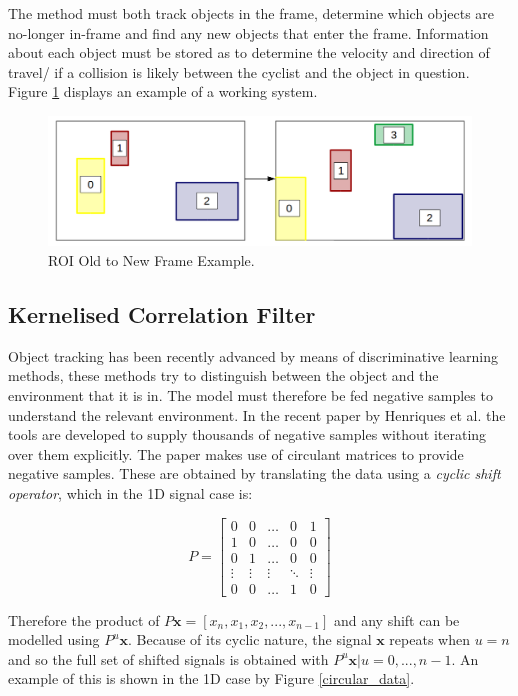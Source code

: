 \documentclass[a4paper,11pt,notitlepage]{article}
\begin{document}
The method must both track objects in the frame, determine which objects are no-longer in-frame and find any new objects that enter the frame. Information about each object must be stored as to determine the velocity and direction of travel/ if a collision is likely between the cyclist and the object in question. Figure \ref{roi_match} displays an example of a working system.

\noindent \begin{figure}[h!]
	\includegraphics[width = 1.0\hsize]{figures/roi_match.png}
	\caption{ROI Old to New Frame Example.}
	\label{roi_match}
\end{figure}


\subsection{Kernelised Correlation Filter}

Object tracking has been recently advanced by means of discriminative learning methods, these methods try to distinguish between the object and the environment that it is in. The model must therefore be fed negative samples to understand the relevant environment. In the recent paper by Henriques et al. \cite{kcf} the tools are developed to supply thousands of negative samples without iterating over them explicitly. The paper makes use of circulant matrices to provide negative samples. These are obtained by translating the data using a \textit{cyclic shift operator}, which in the 1D signal case is:

\begin{equation}
P = 
\begin{bmatrix}
0 & 0 & \dots & 0 & 1 \\
1 & 0 & \dots & 0 & 0 \\
0 & 1 & \dots & 0 & 0 \\
\vdots & \vdots & \vdots & \ddots & \vdots \\
0 & 0 & \dots & 1 & 0
\end{bmatrix}
\end{equation} 

Therefore the product of $P\mathbf{x} = [x_{n},x_{1},x_{2},...,x_{n-1}]$ and any shift can be modelled using $P^{u}\mathbf{x}$. Because of its cyclic nature, the signal $\mathbf{x}$ repeats when $u=n$ and so the full set of shifted signals is obtained with ${P^{u}\mathbf{x} | u=0,...,n-1}$. An example of this is shown in the 1D case by Figure \ref{circular_data}.
\end{document}

